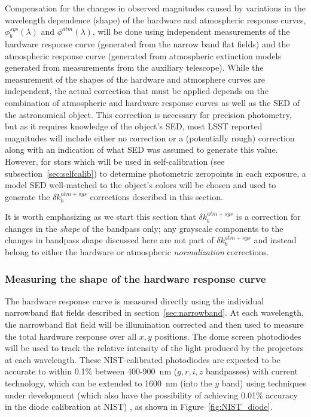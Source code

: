 \documentclass[12pt,preprint]{aastex}
\begin{document}
Compensation for the changes in observed magnitudes caused by
variations in the wavelength dependence (shape) of the hardware and
atmospheric response curves, $\phi_b^{sys}(\lambda)$ and
$\phi^{atm}(\lambda)$, will be done using independent measurements of
the hardware response curve (generated from the narrow band flat fields) and the
atmospheric response curve (generated from atmospheric extinction models
generated from measurements from the auxiliary telescope).  While the
measurement of the shapes of the hardware and atmosphere curves are
independent, the actual correction that must be applied depends on the
combination of atmospheric and hardware response curves as well as the
SED of the astronomical object.  This correction is necessary for
precision photometry, but as it requires knowledge of the object's
SED, most LSST reported magnitudes will include either no correction
or a (potentially rough) correction along with an indication of what
SED was assumed to generate this value. However, for stars which will
be used in self-calibration (see subsection~\ref{sec:selfcalib}) to
determine photometric zeropoints in each exposure, a model SED
well-matched to the object's colors will be chosen and used to
generate the $\delta k_b^{atm+sys}$ corrections described in this
section.

It is worth emphasizing as we start this section that $\delta
k_b^{atm+sys}$ is a correction for changes in the {\it shape} of the
bandpass only; any grayscale components to the changes in bandpass
shape discussed here are not part of $\delta k_b^{atm+sys}$ and instead
belong to either the hardware or atmospheric {\it normalization}
corrections.

\subsubsection{Measuring the shape of the hardware response curve}
\label{sec:phi_hardware}

The hardware response curve is measured directly using the individual
narrowband flat fields described in section~\ref{sec:narrowband}. At
each wavelength, the narrowband flat field will be illumination
corrected and then used to measure the total hardware response over
all $x,y$ positions. The dome screen photodiodes will be used to track
the relative intensity of the light produced by the projectors at each
wavelength. These NIST-calibrated photodiodes are expected to be
accurate to within 0.1\% between 400-900~nm ($g,r,i,z$ bandpasses)
with current technology, which can be extended to 1600~nm (into the
$y$ band) using techniques under development (which also have the
possibility of achieving 0.01\% accuracy in the diode calibration at
NIST) \citep{Eppeldauer09}, as shown in Figure~\ref{fig:NIST_diode}. 
\end{document}
